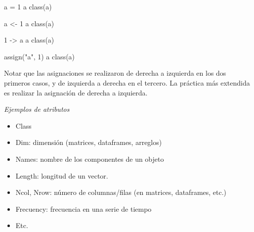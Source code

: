 \documentclass[
  spanish,
  letterpaper,
  DIV=11,
  numbers=noendperiod]{scrreprt}
\newenvironment{Shaded}{\begin{snugshade}}{\end{snugshade}}
\newcommand{\DecValTok}[1]{\textcolor[rgb]{0.68,0.00,0.00}{#1}}
\newcommand{\FunctionTok}[1]{\textcolor[rgb]{0.28,0.35,0.67}{#1}}
\newcommand{\NormalTok}[1]{\textcolor[rgb]{0.00,0.23,0.31}{#1}}
\newcommand{\OtherTok}[1]{\textcolor[rgb]{0.00,0.23,0.31}{#1}}
\newcommand{\StringTok}[1]{\textcolor[rgb]{0.13,0.47,0.30}{#1}}
\begin{document}
\begin{Shaded}
\begin{Highlighting}[]
\NormalTok{a }\OtherTok{=} \DecValTok{1}
\NormalTok{a}
\FunctionTok{class}\NormalTok{(a)}

\NormalTok{a }\OtherTok{\textless{}{-}} \DecValTok{1}
\NormalTok{a}
\FunctionTok{class}\NormalTok{(a)}

\DecValTok{1} \OtherTok{{-}\textgreater{}}\NormalTok{ a}
\NormalTok{a}
\FunctionTok{class}\NormalTok{(a)}

\FunctionTok{assign}\NormalTok{(}\StringTok{"a"}\NormalTok{, }\DecValTok{1}\NormalTok{)}
\NormalTok{a}
\FunctionTok{class}\NormalTok{(a)}
\end{Highlighting}
\end{Shaded}

\begin{tcolorbox}[enhanced jigsaw, arc=.35mm, bottomrule=.15mm, bottomtitle=1mm, breakable, colback=white, colbacktitle=quarto-callout-note-color!10!white, colframe=quarto-callout-note-color-frame, coltitle=black, left=2mm, leftrule=.75mm, opacityback=0, opacitybacktitle=0.6, rightrule=.15mm, title=\textcolor{quarto-callout-note-color}{\faInfo}\hspace{0.5em}{Nota}, titlerule=0mm, toprule=.15mm, toptitle=1mm]

Notar que las asignaciones se realizaron de derecha a izquierda en los
dos primeros casos, y de izquierda a derecha en el tercero. La práctica
más extendida es realizar la asignación de derecha a izquierda.

\end{tcolorbox}

\emph{Ejemplos de atributos}

\begin{itemize}
\item
  Class
\item
  Dim: dimensión (matrices, dataframes, arreglos)
\item
  Names: nombre de los componentes de un objeto
\item
  Length: longitud de un vector.
\item
  Ncol, Nrow: número de columnas/filas (en matrices, dataframes, etc.)
\item
  Frecuency: frecuencia en una serie de tiempo
\item
  Etc.
\end{itemize}
\end{document}
